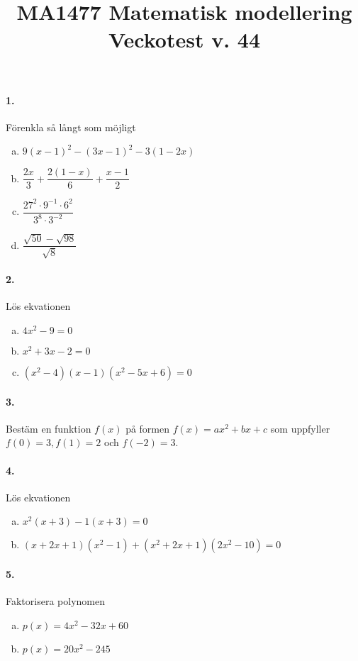\documentclass[a4paper]{article}
\title{\bf MA1477 Matematisk modellering \\[10pt]  Veckotest v.
  44}
\date{}
\begin{document}
\maketitle

\paragraph{1.} Förenkla så långt som möjligt
\begin{enumerate}[(a)]
\item $9(x-1)^2 - (3x-1)^2 - 3(1-2x)$
\item $\dfrac{2x}{3} + \dfrac{2(1-x)}{6} + \dfrac{x-1}{2}$
\item $\dfrac{27^2\cdot 9^{-1}\cdot 6^2}{3^8\cdot 3^{-2}}$
\item $\dfrac{\sqrt{50} - \sqrt{98}}{\sqrt{8}}$
\end{enumerate}
\paragraph{2.} Lös ekvationen
\begin{enumerate}[(a)]
\item $4x^2 - 9 = 0$
\item $x^2 + 3x -2 =0  $
\item $(x^2-4)(x-1)(x^2 - 5x + 6) = 0$
\end{enumerate}
\paragraph{3.} Bestäm en funktion $f(x)$ på formen $f(x) = ax^2 + bx +c$
som uppfyller $f(0) = 3, f(1) = 2$ och $f(-2) = 3$.
\paragraph{4.} Lös ekvationen
\begin{enumerate}[(a)]
\item $x^2(x+3) - 1(x+3) = 0$
\item $(x+2x+1)(x^2-1) + (x^2+2x +1)(2x^2 -10) = 0  $
\end{enumerate}
\paragraph{5.} Faktorisera polynomen
\begin{enumerate}[(a)] 
\item $p(x) = 4x^2 -32x +60$
\item $p(x) = 20x^2 -245$
\end{enumerate}
\end{document}
